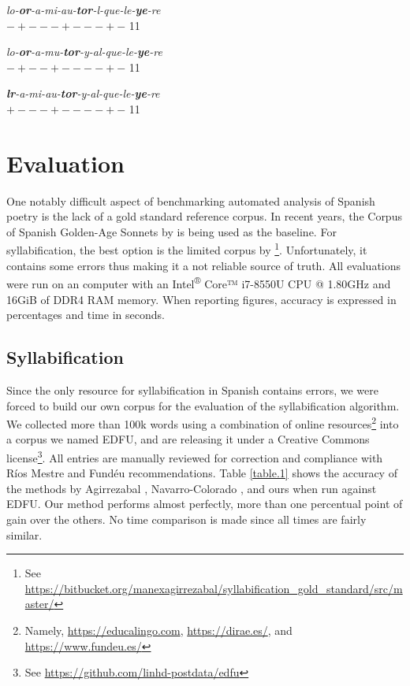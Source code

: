 \documentclass[a4paper,11pt,twocolumn,twoside]{article}
\begin{document}
\begin{subexamples}[preamble={\textit{loor a mi autor, y al que leyere}}]\label{example.4}
\item\label{example.4a}
\textit{lo-\textbf{or}-a-mi-au-\textbf{tor}-l-que-le-\textbf{ye}-re} \\
$-+---+---+-$ 11 \\
\item\label{example.4b}
\textit{lo-\textbf{or}-a-mu-\textbf{tor}-y-al-que-le-\textbf{ye}-re} \\
$-+--+----+-$ 11 \\
\item\label{example.4c}
\textit{\textbf{lr}-a-mi-au-\textbf{tor}-y-al-que-le-\textbf{ye}-re} \\
$+---+----+-$ 11 \\
\end{subexamples}

\section{Evaluation}
One notably difficult aspect of benchmarking automated analysis of Spanish poetry is the lack of a gold standard reference corpus. In recent years, the Corpus of Spanish Golden-Age Sonnets by  is being used as the baseline. For syllabification, the best option is the limited corpus by \footnote{See \url{https://bitbucket.org/manexagirrezabal/syllabification_gold_standard/src/master/}}. Unfortunately, it contains some errors thus making it a not reliable source of truth. All evaluations were run on an computer with an Intel\textsuperscript{®} Core™ i7-8550U CPU @ 1.80GHz and 16GiB of DDR4 RAM memory. When reporting figures, accuracy is expressed in percentages and time in seconds.

\subsection{Syllabification}
Since the only resource for syllabification in Spanish contains errors, we were forced to build our own corpus for the evaluation of the syllabification algorithm. We collected more than 100k words using a combination of online resources\footnote{Namely, \url{https://educalingo.com}, \url{https://dirae.es/}, and \url{https://www.fundeu.es/}} into a corpus we named EDFU, and are releasing it under a Creative Commons license\footnote{See \url{https://github.com/linhd-postdata/edfu}}. All entries are manually reviewed for correction and compliance with Ríos Mestre and Fundéu recommendations.
Table \ref{table.1} shows the accuracy of the methods by Agirrezabal , Navarro-Colorado , and ours when run against EDFU. Our method performs almost perfectly, more than one percentual point of gain over the others. No time comparison is made since all times are fairly similar.
\end{document}

